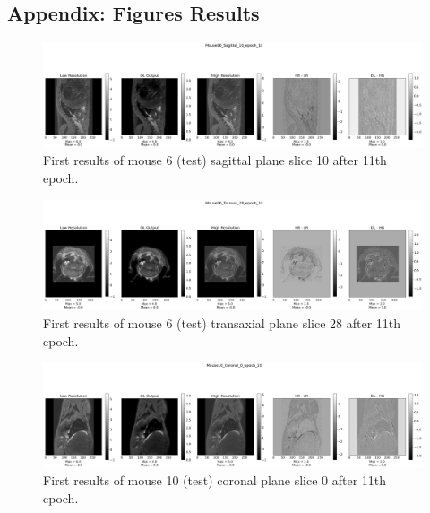 \documentclass[twocolumn]{article}
\begin{document}
\begin{appendices}
\FloatBarrier

\newpage
\section{Appendix: Figures Results}
\label{Appendix: Figures Results}
\begin{figure}[h]
    \centering
    \includegraphics[width=1\linewidth]{Mouse06_Sagittal_10_epoch_10.png}
    \caption{First results of mouse 6 (test) sagittal plane slice 10 after 11th epoch.}
\end{figure}

\begin{figure}[h]
    \centering
    \includegraphics[width=1\linewidth]{Mouse06_Transax_28_epoch_10.png}
    \caption{First results of mouse 6 (test) transaxial plane slice 28 after 11th epoch.}
\end{figure}

\begin{figure}[h]
    \centering
    \includegraphics[width=1\linewidth]{Mouse10_Coronal_0_epoch_10.png}
    \caption{First results of mouse 10 (test) coronal plane slice 0 after 11th epoch.}
\end{figure}


\end{appendices}
\end{document}
